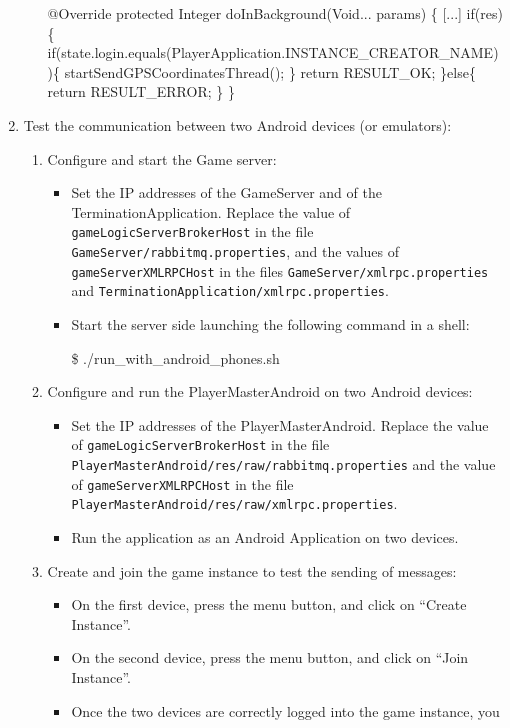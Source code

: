 \begin{enumerate}
\begin{itemize}
\begin{shellcmd}
@Override
protected Integer doInBackground(Void... params) \{
    [...]
    if(res)\{
        if(state.login.equals(PlayerApplication.INSTANCE_CREATOR_NAME))\{
             startSendGPSCoordinatesThread();
        \}
        return RESULT_OK;
    \}else\{
        return RESULT_ERROR;
    \}
\}
\end{shellcmd}
\end{itemize}
\item Test the communication between two Android devices (or emulators):
\label{item_test}
\begin{enumerate}
\item Configure and start the Game server:
\begin{itemize}
\item Set the IP addresses of the GameServer and of the
  TerminationApplication. Replace the value of
  \texttt{gameLogicServerBrokerHost} in the file
  \texttt{GameServer/rabbitmq.properties}, and the values of
  \texttt{gameServerXMLRPCHost} in the files
  \texttt{GameServer/xmlrpc.properties} and
  \texttt{TerminationApplication/xmlrpc.properties}.
\item Start the server side launching the following command in a shell:
  \begin{shellcmd}  
\$ ./run_with_android_phones.sh
\end{shellcmd}
\end{itemize}
\item Configure and run the PlayerMasterAndroid on two Android devices:
\begin{itemize}
\item Set the IP addresses of the PlayerMasterAndroid. Replace the
  value of \texttt{gameLogicServerBrokerHost} in the file
  \texttt{PlayerMasterAndroid/res/raw/rabbitmq.properties} and the
  value of \texttt{gameServerXMLRPCHost} in the file
  \texttt{PlayerMasterAndroid/res/raw/xmlrpc.properties}.
\item Run the application as an Android Application on two devices.
\end{itemize}
\item Create and join the game instance to test the sending of messages:
\begin{itemize}
\item On the first device, press the menu button, and click on
  ``Create Instance''.
\item On the second device, press the menu button, and click on ``Join
  Instance''.
\item Once the two devices are correctly logged into the game instance, you 

\end{itemize}
\end{enumerate}
\end{enumerate}
